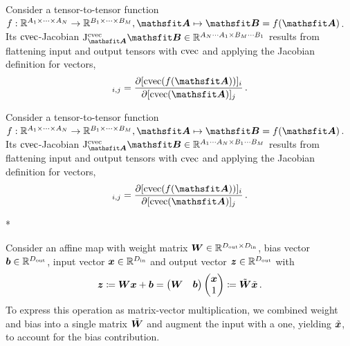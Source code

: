 \begin{paracol}{2}
        \begin{definition}
          Consider a tensor-to-tensor function $f: \sR^{A_1 \times \dots \times A_N} \to \sR^{B_1 \times \dots \times B_M}, \tA \mapsto \tB = f(\tA)$. Its $\operatorname{cvec}$-Jacobian $\jac^{\cvec}_{\tA}\tB \in \sR^{A_N \cdots A_1 \times B_M \cdots B_1}$ results from flattening input and output tensors with $\operatorname{cvec}$ and applying the Jacobian definition for vectors,
          \begin{align*}
            [\jac^{\cvec}_{\tA}\tB]_{i,j}
            =
            \frac{\partial [\cvec(f(\tA))]_i}{\partial [\cvec(\tA)]_j}\,.
          \end{align*}
        \end{definition}

        \begin{definition}
          Consider a tensor-to-tensor function $f: \sR^{A_1 \times \dots \times A_N} \to \sR^{B_1 \times \dots \times B_M}, \tA \mapsto \tB = f(\tA)$. Its $\operatorname{cvec}$-Jacobian $\jac^{\cvec}_{\tA}\tB \in \sR^{A_1 \cdots A_N \times B_1 \cdots B_M}$ results from flattening input and output tensors with $\operatorname{cvec}$ and applying the Jacobian definition for vectors,
          \begin{align*}
            [\jac^{\cvec}_{\tA}\tB]_{i,j}
            =
            \frac{\partial [\cvec(f(\tA))]_i}{\partial [\cvec(\tA)]_j}\,.
          \end{align*}
        \end{definition}

        \switchcolumn[1]


        \switchcolumn[1]*
        \switchcolumn[0]

        \begin{example}
          Consider an affine map with weight matrix ${\bm{W}} \in {\mathbb{R}}^{D_{\text{out}} \times D_{\text{in}}}$, bias vector ${\bm{b}} \in {\mathbb{R}}^{D_{\text{out}}}$, input vector ${\bm{x}} \in {\mathbb{R}}^{D_{\text{in}}}$ and output vector ${\bm{z}} \in {\mathbb{R}}^{D_{\text{out}}}$ with
          \begin{align*}
            {\bm{z}}
            \coloneqq
            {\bm{W}} {\bm{x}} + {\bm{b}}
            =
            \begin{pmatrix}
              {\bm{W}} & {\bm{b}}
            \end{pmatrix}
            \begin{pmatrix}
              {\bm{x}} \\ 1
            \end{pmatrix}
            \coloneqq
            \tilde{{\bm{W}}}
            \tilde{{\bm{x}}}\,.
          \end{align*}
          To express this operation as matrix-vector multiplication, we combined weight and bias into a single matrix $\tilde{{\bm{W}}}$ and augment the input with a one, yielding $\tilde{{\bm{x}}}$, to account for the bias contribution.


\end{example}
\end{paracol}
